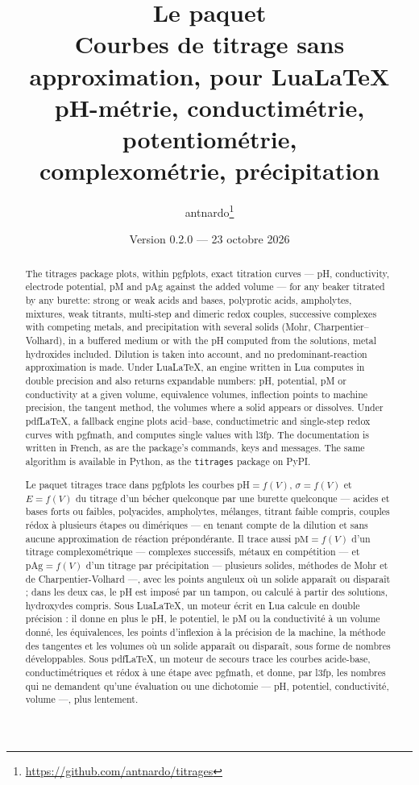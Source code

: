 \documentclass[a4paper,full]{l3doc}
\title{Le paquet \paquet{titrages}\\[2pt]
  \large Courbes de titrage sans approximation, pour Lua\LaTeX\\
  pH-métrie, conductimétrie, potentiométrie,\\ complexométrie, précipitation}
\author{antnardo\thanks{\url{https://github.com/antnardo/titrages}}}
\date{Version 0.2.0 — 23 octobre 2026}
\newcommand\paquet[1]{\textsf{#1}}
\begin{document}
\maketitle

\begin{otherlanguage}{english}
\begin{abstract}\noindent
The \paquet{titrages} package plots, within \paquet{pgfplots}, exact titration
curves — pH, conductivity, electrode potential, pM and pAg against the added volume —
for any beaker titrated by any burette: strong or weak acids and bases, polyprotic
acids, ampholytes, mixtures, weak titrants, multi-step and dimeric redox couples,
successive complexes with competing metals, and precipitation with several solids
(Mohr, Charpentier–Volhard), in a buffered medium or with the pH computed from the
solutions, metal hydroxides included. Dilution is taken into account, and no
predominant-reaction approximation is made.
Under Lua\LaTeX{}, an engine written in Lua computes in double precision and also
returns expandable numbers: pH, potential, pM or conductivity at a given volume,
equivalence volumes, inflection points to machine precision, the tangent method, the
volumes where a solid appears or dissolves. Under pdf\LaTeX{}, a fallback engine plots
acid–base, conductimetric and single-step redox curves with \paquet{pgfmath}, and
computes single values with \paquet{l3fp}.
The documentation is written in French, as are the package's commands, keys and
messages. The same algorithm is available in Python, as the \texttt{titrages}
package on PyPI.
\end{abstract}
\end{otherlanguage}

\begin{abstract}\noindent
Le paquet \paquet{titrages} trace dans \paquet{pgfplots} les courbes pH$=f(V)$,
$\sigma=f(V)$ et $E=f(V)$ du titrage d'un bécher quelconque par une burette
quelconque — acides et bases forts ou faibles, polyacides, ampholytes, mélanges,
titrant faible compris, couples rédox à plusieurs étapes ou dimériques — en tenant
compte de la dilution et sans aucune approximation de réaction prépondérante. Il
trace aussi $\mathrm{pM}=f(V)$ d'un titrage complexométrique — complexes successifs,
métaux en compétition — et $\mathrm{pAg}=f(V)$ d'un titrage par précipitation —
plusieurs solides, méthodes de Mohr et de Charpentier-Volhard —, avec les points
anguleux où un solide apparaît ou disparaît ; dans les deux cas, le pH est imposé par
un tampon, ou calculé à partir des solutions, hydroxydes compris.
Sous Lua\LaTeX{}, un moteur écrit en Lua calcule en double précision : il donne en
plus le pH, le potentiel, le pM ou la conductivité à un volume donné, les
équivalences, les points d'inflexion à la précision de la machine, la méthode des
tangentes et les volumes où un solide apparaît ou disparaît, sous forme de nombres
développables. Sous pdf\LaTeX{}, un moteur de secours trace les courbes acide-base,
conductimétriques et rédox à une étape avec \paquet{pgfmath}, et donne, par
\paquet{l3fp}, les nombres qui ne demandent qu'une évaluation ou une dichotomie — pH,
potentiel, conductivité, volume —, plus lentement.
\end{abstract}
\end{document}
